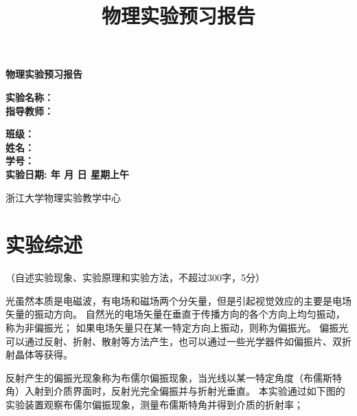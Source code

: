 \documentclass[10pt,a4paper]{ctexart}
\title{\xiaochu\textbf{物理实验预习报告}}
\author{}
\date{}
\newcommand{\myspace}[1]{\par\vspace{#1\baselineskip}} %
\newcommand{\xiaochu}{\fontsize{36pt}{42pt}\selectfont}
\newcommand{\sanhao}{\fontsize{16pt}{20pt}\selectfont}
\newcommand{\sihao}{\fontsize{14pt}{18pt}\selectfont}
\newcommand{\xiaosi}{\fontsize{12pt}{16pt}\selectfont}
\begin{document}
\vspace*{36pt} %

\begin{center}   
    \xiaochu\textbf{物理实验预习报告}
    \vspace{13pt}
    \vspace{13pt}
    \vspace{13pt}
    \vspace{13pt}
    
    \sanhao\textbf{实验名称：\underline{}} \\[10pt]
    \sanhao\textbf{指导教师：\underline{}} \\[30pt]
    
    \myspace{6}
    
   \sihao\textbf{班级：\underline{\makebox[6cm]{}}} \\[10pt]
    \sihao\textbf{姓名：\underline{\makebox[6cm]{}}} \\[10pt]
    \sihao\textbf{学号：\underline{\makebox[6cm]{}}} \\[30pt]
    
   \sihao\textbf{实验日期: 
   \underline{}  年 
   \underline{}月
   \underline{}日  
   星期\underline{}上午}
    
    \vspace{18pt}
    \sihao 浙江大学物理实验教学中心
    
\end{center}

\newpage

    \section{实验综述}
    
    \xiaosi （自述实验现象、实验原理和实验方法，不超过300字，5分）

    光虽然本质是电磁波，有电场和磁场两个分矢量，但是引起视觉效应的主要是电场矢量的振动方向。
    自然光的电场矢量在垂直于传播方向的各个方向上均匀振动，称为非偏振光；
    如果电场矢量只在某一特定方向上振动，则称为偏振光。
    偏振光可以通过反射、折射、散射等方法产生，也可以通过一些光学器件如偏振片、双折射晶体等获得。

    反射产生的偏振光现象称为布儒尔偏振现象，当光线以某一特定角度（布儒斯特角）入射到介质界面时，反射光完全偏振并与折射光垂直。
    本实验通过如下图的实验装置观察布儒尔偏振现象，测量布儒斯特角并得到介质的折射率；
\end{document}

